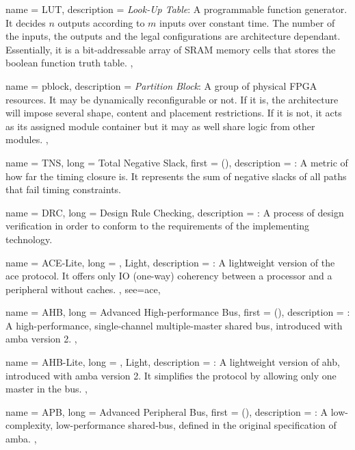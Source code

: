 {
	name = {LUT},
	description = {\emph{Look-Up Table}: 
		A programmable function generator. It decides $n$ outputs according to $m$ inputs
		over constant time. 
		The number of the inputs, the outputs and the legal configurations
		are architecture dependant. 
		Essentially, it is a bit-addressable array of SRAM memory cells
		that stores the boolean function truth table.
	},
}

{
	name = {pblock},
	description = {\emph{Partition Block}:
		A group of physical FPGA resources. It may be dynamically reconfigurable or not.
		If it is, the architecture will impose several shape, content and placement restrictions.
		If it is not, it acts as its assigned module container but it may as well share logic
		from other modules.
	},
}

{
	name = {TNS},
	long = {Total Negative Slack},
	first = { ()},
	description = {\emph{}:
		A metric of how far the timing closure is. It represents the sum
		of negative slacks of all paths that fail timing constraints.
	}
}

{
	name = {DRC},
	long = {Design Rule Checking},
	description = {\emph{}:
		A process of design verification in order to conform to the requirements
		of the implementing technology.
	}
}

{
	name = {ACE-Lite},
	long = {, Light},
	description = {\emph{}:
		A lightweight version of the \gls{ace} protocol. It offers only IO (one-way) coherency
		between a processor and a peripheral without caches.
	},
	see={ace},
}


{
	name = {AHB},
	long = {Advanced High-performance Bus},
	first = { ()},
	description = {\emph{}:
		A high-performance, single-channel multiple-master shared bus, 
		introduced with \gls{amba} version 2.
	},
}


{
	name = {AHB-Lite},
	long = {, Light},
	description = {\emph{}:
		A lightweight version of \gls{ahb}, introduced with \gls{amba} version 2.
		It simplifies the protocol by allowing only one master in the bus.
	},
}


{
	name = {APB},
	long = {Advanced Peripheral Bus},
	first = { ()},
	description = {\emph{}:
		A low-complexity, low-performance shared-bus, defined in the original
		specification of \gls{amba}.
	},
}


